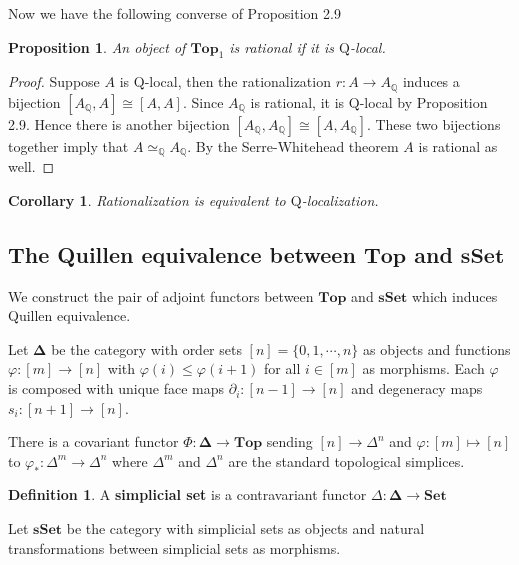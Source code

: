 \documentclass[psamsfonts]{amsart}
\newtheorem{cor}{Corollary}[section]
\newtheorem{prop}{Proposition}[section]
\theoremstyle{definition}
\newtheorem{defn}{Definition}[section]
\newcommand{\Q}{\mathbb{Q}}
\newcommand{\Top}{\mathbf{Top}}
\newcommand{\sSet}{\mathbf{sSet}}
\numberwithin{equation}{section}
\begin{document}
Now we have the following converse of Proposition 2.9

\begin{prop}
An object of $\Top_1$ is rational if it is $\mathrm{Q}$-local.
\end{prop}
\begin{proof}
Suppose $A$ is $\mathrm{Q}$-local, then the rationalization $r:A\to A_\Q$ induces a bijection $[A_\Q,A]\cong[A,A]$. Since $A_\Q$ is rational, it is $\mathrm{Q}$-local by Proposition 2.9. Hence there is another bijection $[A_\Q,A_\Q]\cong[A,A_\Q]$. These two bijections together imply that $A\simeq_\Q A_\Q$. By the Serre-Whitehead theorem $A$ is rational as well.
\end{proof}

\begin{cor}
Rationalization is equivalent to $\mathrm{Q}$-localization.
\end{cor}

\newpage
\subsection{The Quillen equivalence between $\Top$ and $\sSet$}

We construct the pair of adjoint functors between $\Top$ and $\sSet$ which induces Quillen equivalence.\medbreak

Let $\mathbf{\Delta}$ be the category with order sets $[n]=\{0,1,\cdots,n\}$ as objects and functions $\varphi:[m]\to[n]$ with $\varphi(i)\leq\varphi(i+1)$ for all $i\in[m]$ as morphisms. Each $\varphi$ is composed with unique face maps $\partial_i:[n-1]\to[n]$ and degeneracy maps $s_i:[n+1]\to[n]$.

There is a covariant functor $\Phi:\mathbf{\Delta}\to\Top$ sending $[n]\to\Delta^n$ and $\varphi:[m]\mapsto[n]$ to $\varphi_\ast:\Delta^m\to\Delta^n$ where $\Delta^m$ and $\Delta^n$ are the standard topological simplices.

\begin{defn}
A \textbf{simplicial set} is a contravariant functor $\Delta:\mathbf{\Delta}\to\mathbf{Set}$
\end{defn}

Let $\sSet$ be the category with simplicial sets as objects and natural transformations between simplicial sets as morphisms.\medbreak
\end{document}
